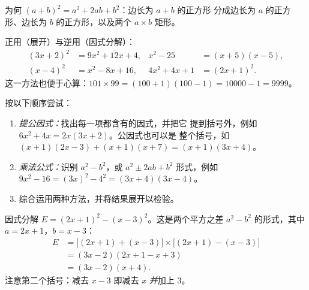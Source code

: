 \begin{omfigure}

{\small 为何 $(a+b)^2 = a^2 + 2ab + b^2$：边长为 $a + b$ 的正方形
分成边长为 $a$ 的正方形、边长为 $b$ 的正方形，以及两个 $a \times b$
矩形。}
\end{omfigure}

\begin{example}\label{ex:g10:algebra:identities}
正用（展开）与逆用（因式分解）：
\begin{align*}
(3x + 2)^2 &= 9x^2 + 12x + 4,
& x^2 - 25 &= (x+5)(x-5), \\
(x - 4)^2 &= x^2 - 8x + 16,
& 4x^2 + 4x + 1 &= (2x + 1)^2 .
\end{align*}
这一方法也便于心算：$101 \times 99 = (100+1)(100-1) =
10000 - 1 = 9999$。
\end{example}

\begin{method}[式子的因式分解]\label{met:g10:algebra:factor}
按以下顺序尝试：
\begin{enumerate}
  \item \emph{提公因式：}找出每一项都含有的因式，并把它
        提到括号外，例如 $6x^2 + 4x = 2x(3x + 2)$。公因式也可以是
        整个括号，如 $(x+1)(2x-3) + (x+1)(x+7) = (x+1)(3x+4)$。
  \item \emph{乘法公式：}识别 $a^2 - b^2$，或
        $a^2 \pm 2ab + b^2$ 形式，例如 $9x^2 - 16 = (3x)^2 - 4^2 =
        (3x+4)(3x-4)$。
  \item 综合运用两种方法，并将结果展开以检验。
\end{enumerate}
\end{method}

\begin{example}\label{ex:g10:algebra:factorsteps}
因式分解 $E = (2x + 1)^2 - (x - 3)^2$。这是两个平方之差
$a^2 - b^2$ 的形式，其中 $a = 2x+1$，$b = x-3$：
\begin{align*}
E &= \bigl[(2x+1) + (x-3)\bigr] \times \bigl[(2x+1) - (x-3)\bigr] \\
  &= (3x - 2)(2x + 1 - x + 3) \\
  &= (3x - 2)(x + 4).
\end{align*}
注意第二个括号：减去 $x - 3$ 即减去 $x$
\emph{并}加上 $3$。
\end{example}

